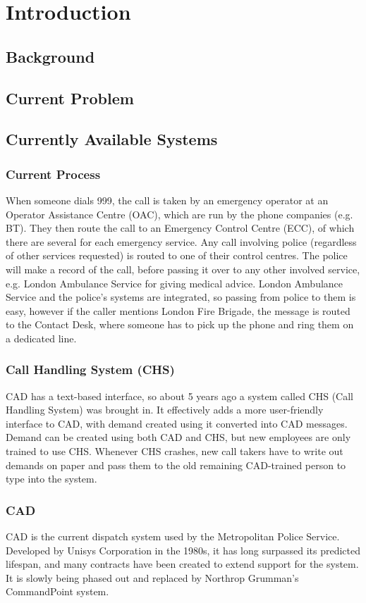 \documentclass{article}
\begin{document}
\pagebreak
    \section{Introduction}
    \subsection{Background}
    \subsection{Current Problem}
    \subsection{Currently Available Systems}
\subsubsection{Current Process}
When someone dials 999, the call is taken by an emergency operator at an Operator Assistance Centre (OAC), which are run by the phone companies (e.g. BT). They then route the call to an Emergency Control Centre (ECC), of which there are several for each emergency service. Any call involving police (regardless of other services requested) is routed to one of their control centres. The police will make a record of the call, before passing it over to any other involved service, e.g. London Ambulance Service for giving medical advice. London Ambulance Service and the police’s systems are integrated, so passing from police to them is easy, however if the caller mentions London Fire Brigade, the message is routed to the Contact Desk, where someone has to pick up the phone and ring them on a dedicated line.

\subsubsection{Call Handling System (CHS)}
CAD has a text-based interface, so about 5 years ago a system called CHS (Call Handling System) was brought in. It effectively adds a more user-friendly interface to CAD, with demand created using it converted into CAD messages. Demand can be created using both CAD and CHS, but new employees are only trained to use CHS. Whenever CHS crashes, new call takers have to write out demands on paper and pass them to the old remaining CAD-trained person to type into the system.

\subsubsection{CAD}
CAD is the current dispatch system used by the Metropolitan Police Service. Developed by Unisys Corporation in the 1980s, it has long surpassed its predicted lifespan, and many contracts have been created to extend support for the system. It is slowly being phased out and replaced by Northrop Grumman’s CommandPoint system.
\end{document}
